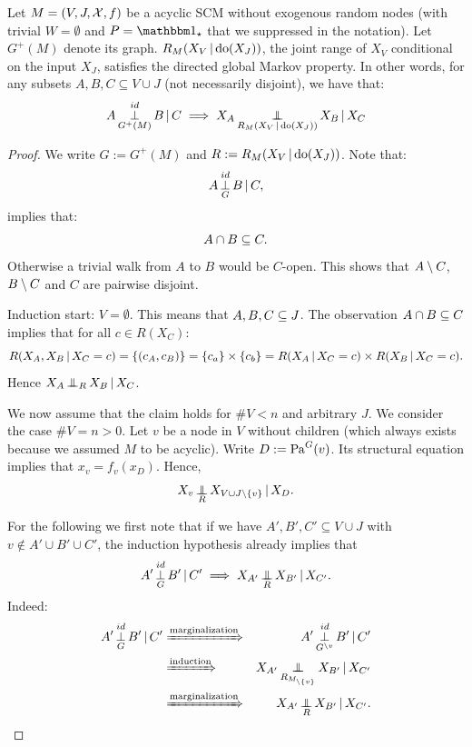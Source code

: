 \begin{Thm}\label{thm:vi_gmp_acyclic_scms}
  Let $M = \left ( V,J,\mathcal{X},f \right )$ be a acyclic SCM without exogenous random nodes (with trivial $W=\emptyset$ and $P = \ind_\star$ that we suppressed in the notation).
  Let $G^+(M)$ denote its graph.
  $R_M(X_V \operatorname*{|} \operatorname{do}(X_J))$, the joint range of $X_V$ conditional on the input $X_J$, satisfies the directed global Markov property.
  In other words, for any subsets $A,B,C \subseteq V \cup J$ (not necessarily disjoint), we have that:
  $$A \operatorname*{\perp}^{id}_{G^+(M)} B \operatorname*{|} C \implies X_A \operatorname*{\perp\mkern-11mu\perp}_{R_M(X_V \operatorname*{|} \operatorname{do}(X_J))} X_B \operatorname*{|} X_C$$
\end{Thm}
\begin{proof}
  We write $G := G^+(M)$ and $R := R_M(X_V \operatorname*{|} \operatorname{do}(X_J))$.
  Note that:
  \[A \operatorname*{\perp}^{id}_G  B \operatorname*{|} C,\] 
  implies that:
  \[ A \cap B \subseteq C.  \]
  Otherwise a trivial walk from $A$ to $B$ would be $C$-open. 
  This shows that $A\setminus C$, $B \setminus C$ and $C$ are pairwise disjoint.

  Induction start: $V=\emptyset$. 
  This means that $A,B,C \subseteq J$.
  The observation $A \cap B \subseteq C$ implies that for all $c \in R(X_C):$
  $$ R(X_A,X_B \operatorname*{|} X_C=c) = \{(c_A,c_B)\} = \{c_a\} \times \{c_b\} = R(X_A \operatorname*{|} X_C=c) \times R(X_B \operatorname*{|} X_C=c).$$
  Hence $X_A \operatorname*{\perp\mkern-11mu\perp}_R X_B \operatorname*{|} X_C$.

  We now assume that the claim holds for $\#V < n$ and arbitrary $J$.
  We consider the case $\#V=n>0$.
  Let $v$ be a node in $V$ without children (which always exists because we assumed $M$ to be acyclic).
  Write $D := \mathrm{Pa}^G(v)$.
  Its structural equation implies that $x_v = f_v(x_D)$.
  Hence,
  $$X_v \operatorname*{\perp\mkern-11mu\perp}_R X_{V \cup J \setminus \{v\}} \operatorname*{|} X_D.$$

  For the following we first note that if we have $A', B', C' \subseteq V \cup J$ with $v \notin A' \cup B' \cup C'$, 
  the induction hypothesis already implies that 
  \[A' \operatorname*{\perp}^{id}_{G} B' \operatorname*{|} C' \implies X_{A'} \operatorname*{\perp\mkern-11mu\perp}_{R} X_{B'} \operatorname*{|} X_{C'}.\]
  Indeed: 
    \begin{align*}
      A' \idPerp_{G} B' \given C'
      & \xRightarrow{\text{marginalization}} &  A' \idPerp_{G^{\sm v}}  B' \given C'\\
      & \xRightarrow{\text{induction}} & X_{A'} \Indep_{R_{M_{\sm \{v\}}}} X_{B'} \given X_{C'}\\
      & \xRightarrow{\text{marginalization}} & X_{A'} \Indep_{R} X_{B'} \given X_{C'}.
    \end{align*}


\end{proof}
